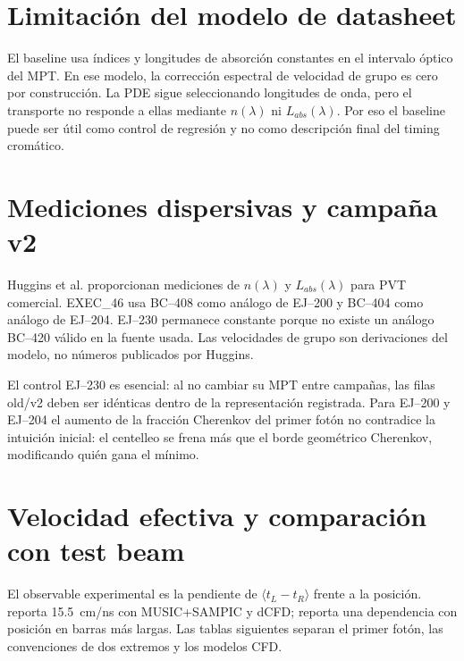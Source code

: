 \chapter{Limitación del modelo de datasheet}
El baseline usa índices y longitudes de absorción constantes en el intervalo óptico del MPT. En ese modelo, la corrección espectral de velocidad de grupo es cero por construcción. La PDE sigue seleccionando longitudes de onda, pero el transporte no responde a ellas mediante $n(\lambda)$ ni $L_{abs}(\lambda)$. Por eso el baseline puede ser útil como control de regresión y no como descripción final del timing cromático.


\chapter{Mediciones dispersivas y campaña v2}
Huggins et al. \cite{Huggins2026} proporcionan mediciones de $n(\lambda)$ y $L_{abs}(\lambda)$ para PVT comercial. EXEC\_46 usa BC--408 como análogo de EJ--200 y BC--404 como análogo de EJ--204. EJ--230 permanece constante porque no existe un análogo BC--420 válido en la fuente usada. Las velocidades de grupo son derivaciones del modelo, no números publicados por Huggins.


El control EJ--230 es esencial: al no cambiar su MPT entre campañas, las filas old/v2 deben ser idénticas dentro de la representación registrada. Para EJ--200 y EJ--204 el aumento de la fracción Cherenkov del primer fotón no contradice la intuición inicial: el centelleo se frena más que el borde geométrico Cherenkov, modificando quién gana el mínimo.

\chapter{Velocidad efectiva y comparación con test beam}
El observable experimental es la pendiente de $\langle t_L-t_R\rangle$ frente a la posición. \cite{Betancourt2020} reporta \SI{15.5}{cm/ns} con MUSIC+SAMPIC y dCFD; \cite{Blondel2018} reporta una dependencia con posición en barras más largas. Las tablas siguientes separan el primer fotón, las convenciones de dos extremos y los modelos CFD.


